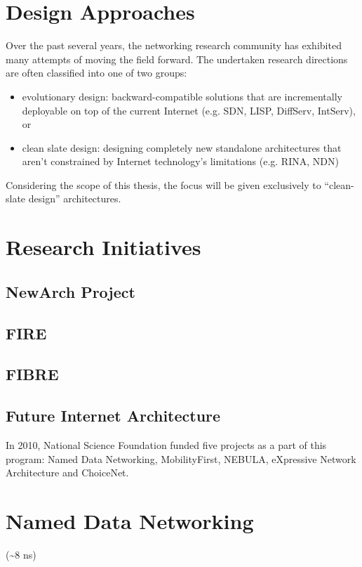     \section{Design Approaches}

        Over the past several years, the networking research community has exhibited many attempts of moving the field forward. The undertaken research directions are often classified into one of two groups:

        \begin{itemize}
            \item evolutionary design: backward-compatible solutions that are incrementally deployable on top of the current Internet (e.g. SDN, LISP, DiffServ, IntServ), or
            \item clean slate design: designing completely new standalone architectures that aren't constrained by Internet technology's limitations (e.g. RINA, NDN)
        \end{itemize}

        Considering the scope of this thesis, the focus will be given exclusively to ``clean-slate design'' architectures.

    \section{Research Initiatives}

        \subsection{NewArch Project}
        \subsection{FIRE}
        \subsection{FIBRE}
        \subsection{Future Internet Architecture}
            In 2010, National Science Foundation funded five projects as a part of this program: Named Data Networking, MobilityFirst, NEBULA, eXpressive Network Architecture and ChoiceNet.

    \section{Named Data Networking}
        (\textasciitilde8 ns)
